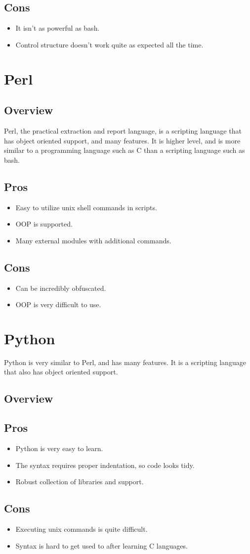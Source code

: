 \documentclass{article}
\begin{document}
\subsection{Cons}
\begin{itemize}
\item It isn't as powerful as bash. 
\item Control structure doesn't work quite as expected all the time. 
\end{itemize}
\section{Perl}
\subsection{Overview}
Perl, the practical extraction and report language, is a scripting language that has object oriented support, and many features. It is higher level, and is more similar to a programming language such as C than a scripting language such as bash. 
\subsection{Pros}
\begin{itemize}
\item	Easy to utilize unix shell commands in scripts. 
\item	OOP is supported. 
\item 	Many external modules with additional commands. 
\end{itemize}
\subsection{Cons}
\begin{itemize}
\item	Can be incredibly obfuscated. 
\item	OOP is very difficult to use. 
\end{itemize}
\section{Python}
Python is very similar to Perl, and has many features.  It is a scripting language that also has object oriented support. 
\subsection{Overview}
\subsection{Pros}
\begin{itemize}
\item	Python is very easy to learn. 
\item	The syntax requires proper indentation, so code looks tidy.  
\item	Robust collection of libraries and support. 
\end{itemize}
\subsection{Cons}
\begin{itemize}
\item	Executing unix commands is quite difficult. 
\item	Syntax is hard to get used to after learning C languages. 
\end{itemize}
\end{document}
